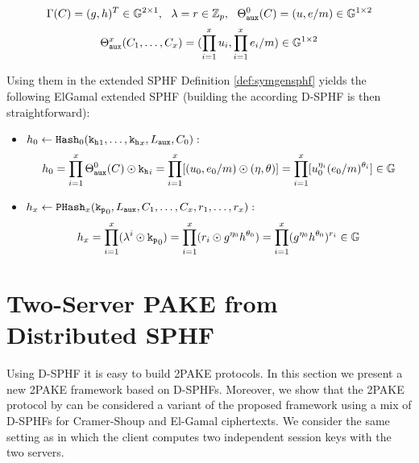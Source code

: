 \[ \Gamma(C)= (g,h)^T \in \mathbb{G}^{2\times 1},~~ {\lambda}=r\in\mathbb{Z}_p,~~ \Theta^0_{\mathtt{aux}}(C)=(u,e/m)\in\mathbb{G}^{1\times 2} \]
\[ \Theta^x_{\mathtt{aux}}(C_1,\dots,C_x)=(\prod^x_{i=1}u_{i},\prod^x_{i=1}e_i/m)\in\mathbb{G}^{1\times 2} \]

\noindent
Using them in the extended \ac{SPHF} Definition \ref{def:symgensphf} yields the following ElGamal extended \ac{SPHF} (building the according \ac{D-SPHF} is then straightforward):
\begin{itemize}
	\item $h_0\gets\mathtt{Hash}_0(\mathtt{k_h}_1,\dots,\mathtt{k_h}_x,L_\mathtt{aux},C_0):$
	 $$h_0=\prod_{i=1}^x\Theta_\mathtt{aux}^0(C) \odot \mathtt{k_h}_i = \prod_{i=1}^x [(u_0,e_0/m) \odot (\eta,\theta)] =\prod_{i=1}^x [u_0^{\eta_i}(e_0/m)^{\theta_i}]\in\mathbb{G}$$
	
	\item $h_x\gets\mathtt{PHash}_x(\mathtt{k_p}_0,L_\mathtt{aux},C_1,\dots,C_x,r_1,\dots,r_x):$
	$$h_x = \prod_{i=1}^x (\lambda^i \odot \mathtt{k_p}_0) = \prod_{i=1}^x (r_i \odot g^{\eta_0}h^{\theta_0}) = \prod_{i=1}^x (g^{\eta_0}h^{\theta_0})^{r_i} \in\mathbb{G}$$
\end{itemize}



\section{Two-Server PAKE from Distributed SPHF}\label{sec:twoserverpake}
Using \ac{D-SPHF} it is easy to build \ac{2PAKE} protocols.
In this section we present a new \ac{2PAKE} framework based on \acp{D-SPHF}.
Moreover, we show that the \ac{2PAKE} protocol by \citet{Katz2012a} can be considered a variant of the proposed framework using a mix of \acp{D-SPHF} for Cramer-Shoup and El-Gamal ciphertexts.
We consider the same setting as \citet{Katz2012a} in which the client computes two independent session keys with the two servers.

